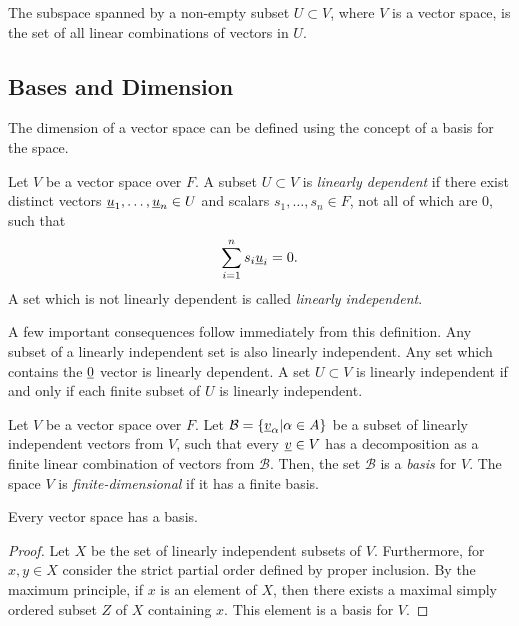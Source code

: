 The subspace spanned by a non-empty subset $U \subset V$, where $V$ is a vector space, is the set of all linear combinations of vectors in $U$.


\subsection{Bases and Dimension}
\label{section:BasesAndDimension}

The dimension of a vector space can be defined using the concept of a basis for the space.

\begin{definition}
Let $V$ be a vector space over $F$.
A subset $U \subset V$ is \emph{linearly dependent} if there exist distinct vectors $\underline{u}_1, \ldots, \underline{u}_n \in U$ and scalars $s_1, \ldots, s_n \in F$, not all of which are $0$, such that
\begin{equation*}
\sum_{i=1}^n s_i \underline{u}_i = 0.
\end{equation*}
A set which is not linearly dependent is called \emph{linearly independent}.
\end{definition}

A few important consequences follow immediately from this definition.
Any subset of a linearly independent set is also linearly independent.
Any set which contains the $\underline{0}$ vector is linearly dependent.
A set $U \subset V$ is linearly independent if and only if each finite subset of $U$ is linearly independent.

\begin{definition}
Let $V$ be a vector space over $F$.
Let $\mathcal{B} = \left\{ \underline{v}_{\alpha} | \alpha \in A \right\}$ be a subset of linearly independent vectors from $V$, such that every $\underline{v} \in V$ has a decomposition as a finite linear combination of vectors from $\mathcal{B}$.
Then, the set $\mathcal{B}$ is a \emph{basis} for $V$.
The space $V$ is \emph{finite-dimensional} if it has a finite basis.
\end{definition}

\begin{theorem}
Every vector space has a basis.
\end{theorem}
\begin{proof}
Let $X$ be the set of linearly independent subsets of $V$.
Furthermore, for $x, y \in X$ consider the strict partial order defined by proper inclusion.
By the maximum principle, if $x$ is an element of $X$, then there exists a maximal simply ordered subset $Z$ of $X$ containing $x$.
This element is a basis for $V$.
\end{proof}

